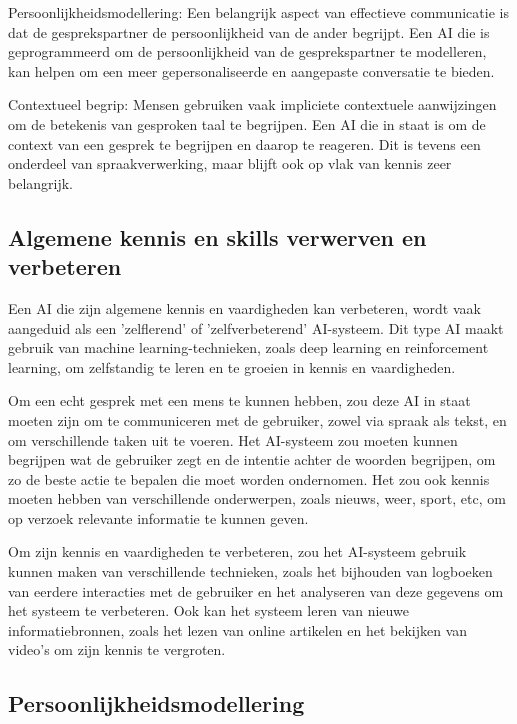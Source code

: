 Persoonlijkheidsmodellering: Een belangrijk aspect van effectieve communicatie is dat de gesprekspartner de persoonlijkheid van de ander begrijpt. Een AI die is geprogrammeerd om de persoonlijkheid van de gesprekspartner te modelleren, kan helpen om een meer gepersonaliseerde en aangepaste conversatie te bieden.

Contextueel begrip: Mensen gebruiken vaak impliciete contextuele aanwijzingen om de betekenis van gesproken taal te begrijpen. Een AI die in staat is om de context van een gesprek te begrijpen en daarop te reageren. Dit is tevens een onderdeel van spraakverwerking, maar blijft ook op vlak van kennis zeer belangrijk.

\newpage

\subsection{Algemene kennis en skills verwerven en verbeteren}

Een AI die zijn algemene kennis en vaardigheden kan verbeteren, wordt vaak aangeduid als een 'zelflerend' of 'zelfverbeterend' AI-systeem. Dit type AI maakt gebruik van machine learning-technieken, zoals deep learning en reinforcement learning, om zelfstandig te leren en te groeien in kennis en vaardigheden.

Om een echt gesprek met een mens te kunnen hebben, zou deze AI in staat moeten zijn om te communiceren met de gebruiker, zowel via spraak als tekst, en om verschillende taken uit te voeren. Het AI-systeem zou moeten kunnen begrijpen wat de gebruiker zegt en de intentie achter de woorden begrijpen, om zo de beste actie te bepalen die moet worden ondernomen. Het zou ook kennis moeten hebben van verschillende onderwerpen, zoals nieuws, weer, sport, etc, om op verzoek relevante informatie te kunnen geven.

Om zijn kennis en vaardigheden te verbeteren, zou het AI-systeem gebruik kunnen maken van verschillende technieken, zoals het bijhouden van logboeken van eerdere interacties met de gebruiker en het analyseren van deze gegevens om het systeem te verbeteren. Ook kan het systeem leren van nieuwe informatiebronnen, zoals het lezen van online artikelen en het bekijken van video's om zijn kennis te vergroten.

\subsection{Persoonlijkheidsmodellering}

